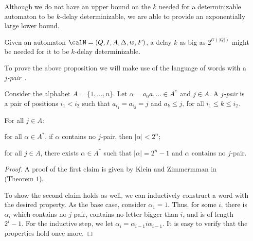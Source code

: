 \documentclass[a4paper]{article}
\begin{document}

Although we do not have an upper bound on the
$k$ needed for a determinizable automaton to be $k$-delay determinizable, we are
able to provide an exponentially large lower bound.

\begin{proposition}\label{pro:exp-delay-necessary}
	Given an automaton $\calN = (Q,I,A,\Delta,w,F)$, a delay $k$ as big as
	$2^{\mathcal{O}(|Q|)}$ might be needed for it to be $k$-delay
	determinizable.
\end{proposition}

To prove the above proposition we will make use of the language of words with a
\emph{$j$-pair}~\cite{kz15}.

Consider the alphabet $A = \{1,\dots,n\}$.  Let $\alpha = a_0 a_1 \dots
\in A^*$ and $j \in A$. A \emph{$j$-pair} is a pair of positions
$i_1 < i_2$ such that $a_{i_1} = a_{i_2} = j$ and $a_k \le j$, for all
$i_1 \le k \le i_2$.

\begin{lemma}\label{lem:props-jpair}
	For all $j \in A$:
	\begin{inparaenum}[$(i)$]
		\item for all $\alpha \in A^*$, if $\alpha$ contains no
			$j$-pair, then $|\alpha| < 2^{n}$;
		\item for all $j \in A$, there exists $\alpha \in A^*$ such that
			$|\alpha| = 2^{n} - 1$ and $\alpha$ contains no
			$j$-pair.
	\end{inparaenum}
\end{lemma}
\begin{proof}
	A proof of the first claim is given by Klein and Zimmermman
	in~\cite{kz15} (Theorem $1$).

	To show the second claim holds as well, we can inductively construct a
	word with the desired property. As the base case, consider $\alpha_1 = 1$.
	Thus, for some $i$, there is $\alpha_i$ which contains no $j$-pair,
	contains no letter bigger than $i$, and is of length $2^i - 1$. For the
	inductive step, we let $\alpha_i = \alpha_{i-1} i \alpha_{i-1}$. It is
	easy to verify that the properties hold once more.
\end{proof}
\end{document}
